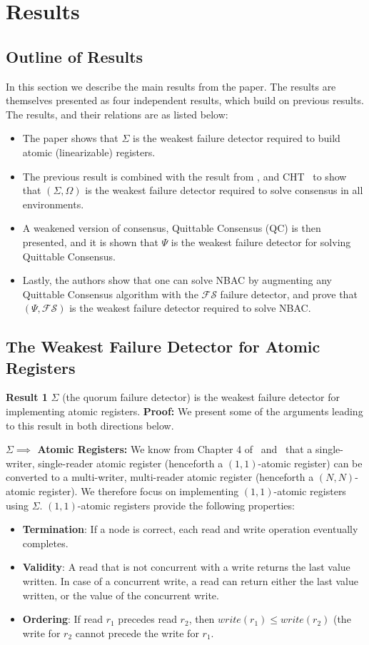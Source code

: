 \section{Results}
\subsection{Outline of Results}
In this section we describe the main results from the paper. The results are themselves presented as four independent
results, which build on previous results. The results, and their relations are as listed below:
\begin{itemize}
\item The paper shows that $\Sigma$ is the weakest failure detector required to build atomic (linearizable) registers.
\item The previous result is combined with the result from \cite{lo1994using}, and CHT~\cite{chandra1996weakest} to show
that $(\Sigma, \Omega)$ is the weakest failure detector required to solve consensus in all environments.
\item A weakened version of consensus, Quittable Consensus (QC) is then presented, and it is shown that $\Psi$ is the weakest
failure detector for solving Quittable Consensus.
\item Lastly, the  authors show that one can solve NBAC by augmenting any Quittable Consensus algorithm with the
$\mathcal{FS}$ failure detector, and prove that $(\Psi, \mathcal{FS})$ is the weakest failure detector required to solve
NBAC.
\end{itemize}

\subsection{The Weakest Failure Detector for Atomic Registers}
\textbf{Result 1} $\Sigma$ (the quorum failure detector) is the weakest failure detector for implementing atomic
registers.
\textbf{Proof:} We present some of the arguments leading to this result in both directions below.

\textbf{$\Sigma \implies$ Atomic Registers:} We know from Chapter 4 of~\cite{cachin2011introduction}
and~\cite{vitanyi1986atomic} that a single-writer, single-reader atomic register (henceforth a $(1,1)$-atomic register)
can be converted to a multi-writer, multi-reader atomic register (henceforth a $(N, N)$-atomic register). We therefore
focus on implementing $(1, 1)$-atomic registers using $\Sigma$. $(1, 1)$-atomic registers provide the following properties:
\begin{itemize}
\item \textbf{Termination}: If a node is correct, each read and write operation eventually completes.
\item \textbf{Validity}: A read that is not concurrent with a write returns the last value written. In case of a
concurrent write, a read can return either the last value written, or the value of the concurrent write. 
\item \textbf{Ordering}: If read $r_1$ precedes read $r_2$, then $write(r_1) \leq write(r_2)$ (\ie the write for $r_2$
cannot precede the write for $r_1$.
\end{itemize}

